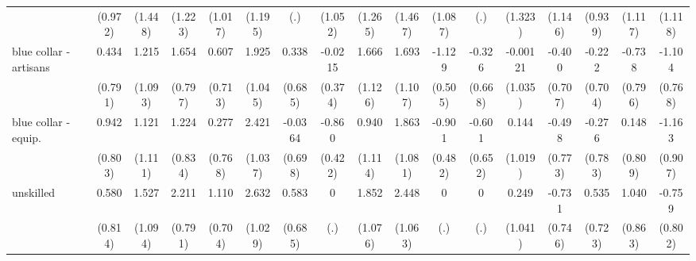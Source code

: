 {\begin{tabular}{l*{16}{c}}
                    &     (0.972)         &     (1.448)         &     (1.223)         &     (1.017)         &     (1.195)         &         (.)         &     (1.052)         &     (1.265)         &     (1.467)         &     (1.087)         &         (.)         &     (1.323)         &     (1.146)         &     (0.939)         &     (1.117)         &     (1.118)         \\
[1em]
blue collar - artisans&       0.434         &       1.215         &       1.654\sym{*}  &       0.607         &       1.925         &       0.338         &     -0.0215         &       1.666         &       1.693         &      -1.129\sym{*}  &      -0.326         &    -0.00121         &      -0.400         &      -0.222         &      -0.738         &      -1.104         \\
                    &     (0.791)         &     (1.093)         &     (0.797)         &     (0.713)         &     (1.045)         &     (0.685)         &     (0.374)         &     (1.126)         &     (1.107)         &     (0.505)         &     (0.668)         &     (1.035)         &     (0.707)         &     (0.704)         &     (0.796)         &     (0.768)         \\
[1em]
blue collar - equip.&       0.942         &       1.121         &       1.224         &       0.277         &       2.421\sym{*}  &     -0.0364         &      -0.860\sym{*}  &       0.940         &       1.863         &      -0.901         &      -0.601         &       0.144         &      -0.498         &      -0.276         &       0.148         &      -1.163         \\
                    &     (0.803)         &     (1.111)         &     (0.834)         &     (0.768)         &     (1.037)         &     (0.698)         &     (0.422)         &     (1.114)         &     (1.081)         &     (0.482)         &     (0.652)         &     (1.019)         &     (0.773)         &     (0.783)         &     (0.809)         &     (0.907)         \\
[1em]
unskilled           &       0.580         &       1.527         &       2.211\sym{**} &       1.110         &       2.632\sym{*}  &       0.583         &           0         &       1.852         &       2.448\sym{*}  &           0         &           0         &       0.249         &      -0.731         &       0.535         &       1.040         &      -0.759         \\
                    &     (0.814)         &     (1.094)         &     (0.791)         &     (0.704)         &     (1.029)         &     (0.685)         &         (.)         &     (1.076)         &     (1.063)         &         (.)         &         (.)         &     (1.041)         &     (0.746)         &     (0.723)         &     (0.863)         &     (0.802)         \\

\end{tabular}}
